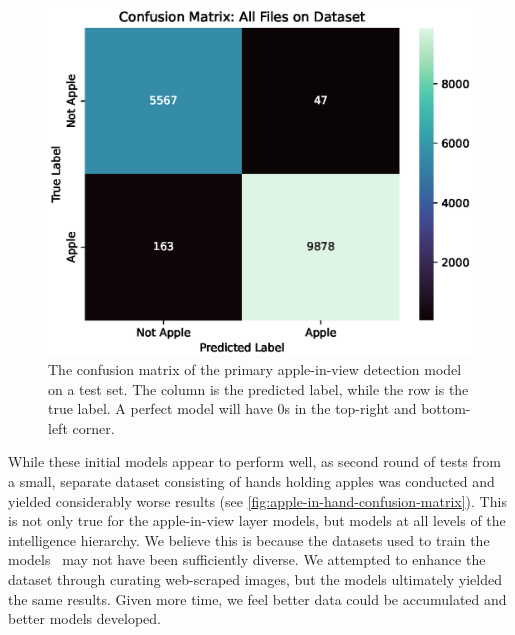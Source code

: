 \begin{figure}[htb]
    \centering
    \includegraphics[width=\columnwidth,keepaspectratio]
    {./figures/confusion_matrix_All_Files_on_Dataset}
    \caption{
        The confusion matrix of the primary apple-in-view detection model on a test set.
        The column is the predicted label, while the row is the true label.
        A perfect model will have 0s in the top-right and bottom-left corner.
    }
    \label{fig:apple-in-view-confusion-matrix}
\end{figure}

While these initial models appear to perform well, as second round of tests from a
small, separate dataset consisting of hands holding apples was conducted and yielded
considerably worse results (see \autoref{fig:apple-in-hand-confusion-matrix}).
This is not only true for the apple-in-view layer models, but models at all levels of
the intelligence hierarchy.
We believe this is because the datasets used to train the models~\cite{Fruit360,
    Sultana2022} may not have been sufficiently diverse.
We attempted to enhance the dataset through curating web-scraped images, but the
models ultimately yielded the same results.
Given more time, we feel better data could be accumulated and better models developed.

